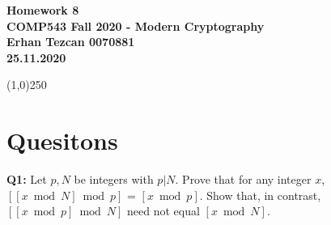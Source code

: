 \documentclass[12pt,reqno]{amsart}
\newcommand{\code}[1]{\texttt{#1}}
\begin{document}
\begin{center}
\large\textbf{Homework 8 \\ COMP543 Fall 2020 - Modern Cryptography \\}
\normalsize\textbf{ Erhan Tezcan 0070881 \\ 25.11.2020} \\
\end{center}

\begin{center}
\line(1,0){250}
\end{center}

%
%

%
%
\section{Quesitons}
\textbf{Q1:} Let $p,N$ be integers with $p|N$. Prove that for any integer $x$, $[[x \bmod N] \bmod p]$ = $[x \bmod p]$. Show that, in contrast, $[[x \bmod p] \bmod N]$ need not equal $[x \bmod N]$.
\end{document}
